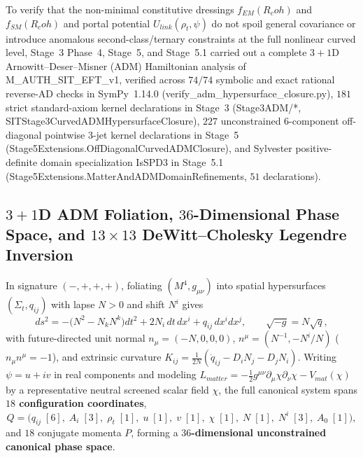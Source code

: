 \documentclass[american,11pt,letterpaper]{article}
\newcommand{\Rcoh}{R_{\mathrm{coh}}}
\def\mathcal#1{#1}%
\def\mathrm#1{#1}%
\def\texttt#1{#1}%
\def\Rcoh{R_coh}%
\begin{document}
To verify that the non-minimal constitutive dressings $f_{\mathrm{EM}}(\Rcoh)$ and $f_{\mathrm{SM}}(\Rcoh)$ and portal potential $U_{\mathrm{link}}(\rho_t, \psi)$ do not spoil general covariance or introduce anomalous second-class/ternary constraints at the full nonlinear curved level, Stage~3 Phase~4, Stage~5, and Stage~5.1 carried out a complete $3+1$D Arnowitt--Deser--Misner (ADM) Hamiltonian analysis of \texttt{M\_AUTH\_SIT\_EFT\_v1}, verified across $74/74$ symbolic and exact rational reverse-AD checks in SymPy~1.14.0 (\texttt{verify\_\allowbreak{}adm\_\allowbreak{}hypersurface\_\allowbreak{}closure.\allowbreak{}py}), $181$ strict standard-axiom kernel declarations in Stage~3 (\texttt{Stage3ADM/*}, \texttt{SITStage3\allowbreak{}Curved\allowbreak{}ADMHypersurface\allowbreak{}Closure}), $227$ unconstrained 6-component off-diagonal pointwise 3-jet kernel declarations in Stage~5 (\texttt{Stage5\allowbreak{}Extensions.\allowbreak{}Off\allowbreak{}Diagonal\allowbreak{}Curved\allowbreak{}ADMClosure}), and Sylvester positive-definite domain specialization \texttt{IsSPD3} in Stage~5.1 (\texttt{Stage5\allowbreak{}Extensions.\allowbreak{}Matter\allowbreak{}And\allowbreak{}ADMDomain\allowbreak{}Refinements}, $51$ declarations).

\subsection{$3+1$D ADM Foliation, $36$-Dimensional Phase Space, and $13\times 13$ DeWitt--Cholesky Legendre Inversion}

In signature $(-,+,+,+)$, foliating $(\mathcal{M}^4, g_{\mu\nu})$ into spatial hypersurfaces $(\Sigma_t, q_{ij})$ with lapse $N > 0$ and shift $N^i$ gives
\begin{equation}
ds^2 = -\bigl(N^2 - N_k N^k\bigr)dt^2 + 2 N_i\,dt\,dx^i + q_{ij}\,dx^i dx^j,
\qquad
\sqrt{-g} = N\sqrt{q},
\label{eq:adm_metric_foliation}
\end{equation}
with future-directed unit normal $n_\mu = (-N,0,0,0)$, $n^\mu = (N^{-1}, -N^i/N)$ ($n_\mu n^\mu = -1$), and extrinsic curvature $K_{ij} = \frac{1}{2N}(\dot{q}_{ij} - D_i N_j - D_j N_i)$. Writing $\psi = u + iv$ in real components and modeling $\mathcal{L}_{\mathrm{matter}} = -\frac{1}{2}g^{\mu\nu}\partial_\mu\chi\partial_\nu\chi - V_{\mathrm{mat}}(\chi)$ by a representative neutral screened scalar field $\chi$, the full canonical system spans \textbf{$18$ configuration coordinates},
\[
\mathcal{Q} = \bigl(q_{ij}\;[6],\; A_i\;[3],\; \rho_t\;[1],\; u\;[1],\; v\;[1],\; \chi\;[1],\; N\;[1],\; N^i\;[3],\; A_0\;[1]\bigr),
\]
and $18$ conjugate momenta $\mathcal{P}$, forming a \textbf{$36$-dimensional unconstrained canonical phase space}.
\end{document}

